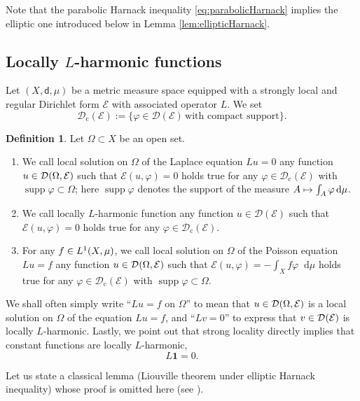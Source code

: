 \documentclass[10pt]{amsart}
\newcommand\mto{\mathchoice{\longmapsto}{\mapsto}{\mapsto}{\mapsto}}
\newcommand{\rmc}{\mathrm{c}}
\newcommand{\NoChangel}[1]{%
\expandafter\let\csname old\string#1\endcsname=#1
\let#1=\relax
\newcommand{#1}{\mathcode`l="716C\csname old\string#1\endcsname\mathcode`l="7160 }%
}
\theoremstyle{plain}
\theoremstyle{definition}
\newtheorem{definition}[theorem]{Definition}
\newcommand{\cE}{\mathcal{E}}
\newcommand{\cD}{\mathcal{D}}
\let\phi\varphi
\newcommand{\di}{\mathop{}\!\mathrm{d}}
\newcommand{\loc}{\mathrm{loc}}\NoChangel{\loc}
\DeclareMathOperator{\supp}{supp}
\newcommand{\dist}{\mathsf{d}}
\begin{document}
Note that the parabolic Harnack inequality \eqref{eq:parabolicHarnack} implies the elliptic one introduced below in Lemma \ref{lem:ellipticHarnack}.

\subsection*{Locally $L$-harmonic functions}

Let $(X,\dist,\mu)$ be a metric measure space equipped with a strongly local and regular Dirichlet form $\cE$ with associated operator $L$. We set
\[
\cD_\rmc(\cE):=\{ \phi \in \cD(\cE) \, \text{with compact support}\}.
\]

\begin{definition}\label{def:localsol} Let $\Omega \subset X$ be an open set.

\begin{enumerate}
\item
We call local solution on $\Omega$ of the Laplace equation $Lu=0$ any function $u \in \cD_{\loc}(\Omega,\cE)$ such that $\cE(u,\phi)=0$ holds true for any $\phi \in \cD_\rmc(\cE)$ with $\supp \phi \subset \Omega$; here $\supp \phi$ denotes the support of the measure $A \mto \int_A \phi \di \mu$.

\item
We call locally $L$-harmonic function any function $u \in \cD(\cE)$ such that $\cE(u,\phi)=0$ holds true for any $\phi \in \cD_\rmc(\cE)$.

\item
For any $f \in L^1_{\loc}(X,\mu)$, we call local solution on $\Omega$ of the Poisson equation $Lu=f$ any function $u \in \cD_{\loc}(\Omega, \cE)$ such that $\cE(u,\phi)=-\int_X f \phi \di \mu$ holds true for any $\phi \in \cD_\rmc(\cE)$ with $\supp \phi \subset \Omega$.
\end{enumerate}
\end{definition}

We shall often simply write ``$Lu=f$ on $\Omega$'' to mean that $u \in \cD_{\loc}(\Omega, \cE)$ is a local solution on $\Omega$ of the equation $Lu=f$, and ``$Lv=0$'' to express that $v \in \cD_{\loc}(\cE)$ is locally $L$-harmonic. Lastly, we point out that strong locality directly implies that constant functions are locally $L$-harmonic, \ie
\[
L\mathbf{1}=0.
\]

Let us state a classical lemma (Liouville theorem under elliptic Harnack inequality) whose proof is omitted here (see \eg \cite[Lem.\,7.3]{AldanaCarronTapie}).
\end{document}
